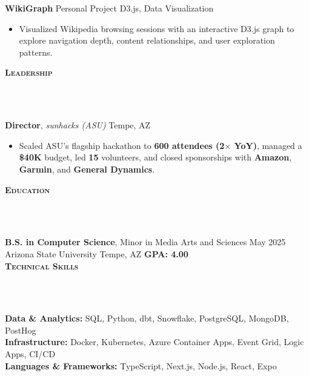 \documentclass[10pt]{article}
\newcommand{\lineunder} {
    \vspace*{-10pt} \\
    \hspace*{-18pt} \hrulefill \\
    \vspace*{2pt}
}
\newcommand{\header} [1] {
  \vspace*{2pt}
    {\hspace*{-15pt}\textsc{#1}}
    \lineunder
}
\begin{document}
\textbf{WikiGraph} \hfill Personal Project \textbar{} D3.js, Data Visualization\\
\vspace{-2mm}
\begin{itemize}[leftmargin=5mm, itemsep=0mm]
  \item Visualized Wikipedia browsing sessions with an interactive D3.js graph to explore navigation depth, content relationships, and user exploration patterns.
\end{itemize}
\vspace{-2mm}
\header{\textbf{Leadership}}
\textbf{Director}, \textit{sunhacks (ASU)} \hfill Tempe, AZ\\
\vspace{-2mm}
\begin{itemize}[leftmargin=5mm, itemsep=0mm]
  \item Scaled ASU's flagship hackathon to \textbf{600 attendees (2$\times$ YoY)}, managed a \textbf{\$40K} budget, led \textbf{15} volunteers, and closed sponsorships with \textbf{Amazon}, \textbf{Garmin}, and \textbf{General Dynamics}.
\end{itemize}

\header{\textbf{Education}}
\textbf{B.S. in Computer Science}, Minor in Media Arts and Sciences \hfill May 2025\\
Arizona State University \hfill Tempe, AZ \textbar{} \textbf{GPA: 4.00}
\\
\header{\textbf{Technical Skills}}
\textbf{Data \& Analytics:} SQL, Python, dbt, Snowflake, PostgreSQL, MongoDB, PostHog\\
\textbf{Infrastructure:} Docker, Kubernetes, Azure Container Apps, Event Grid, Logic Apps, CI/CD\\
\textbf{Languages \& Frameworks:} TypeScript, Next.js, Node.js, React, Expo\\
\end{document}
